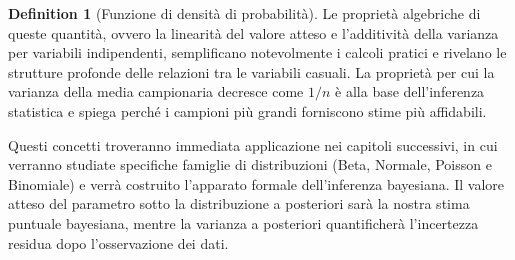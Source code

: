 \documentclass[
  letterpaper,
  DIV=11,
  numbers=noendperiod,
  oneside]{scrreprt}
\theoremstyle{definition}
\theoremstyle{plain}
\theoremstyle{definition}
\newtheorem{definition}{Definition}[chapter]
\theoremstyle{remark}
\begin{document}
\begin{definition}[Funzione di densità di
probabilità]
Le proprietà algebriche di queste quantità, ovvero la linearità del
valore atteso e l'additività della varianza per variabili indipendenti,
semplificano notevolmente i calcoli pratici e rivelano le strutture
profonde delle relazioni tra le variabili casuali. La proprietà per cui
la varianza della media campionaria decresce come \(1/n\) è alla base
dell'inferenza statistica e spiega perché i campioni più grandi
forniscono stime più affidabili.

Questi concetti troveranno immediata applicazione nei capitoli
successivi, in cui verranno studiate specifiche famiglie di
distribuzioni (Beta, Normale, Poisson e Binomiale) e verrà costruito
l'apparato formale dell'inferenza bayesiana. Il valore atteso del
parametro sotto la distribuzione a posteriori sarà la nostra stima
puntuale bayesiana, mentre la varianza a posteriori quantificherà
l'incertezza residua dopo l'osservazione dei dati.

\begin{tcolorbox}[enhanced jigsaw, arc=.35mm, breakable, colbacktitle=quarto-callout-note-color!10!white, opacityback=0, toprule=.15mm, rightrule=.15mm, colback=white, opacitybacktitle=0.6, leftrule=.75mm, coltitle=black, bottomtitle=1mm, left=2mm, toptitle=1mm, title=\textcolor{quarto-callout-note-color}{\faInfo}\hspace{0.5em}{Informazioni sull'ambiente di sviluppo}, titlerule=0mm, bottomrule=.15mm, colframe=quarto-callout-note-color-frame]


\end{tcolorbox}
\end{definition}
\end{document}
